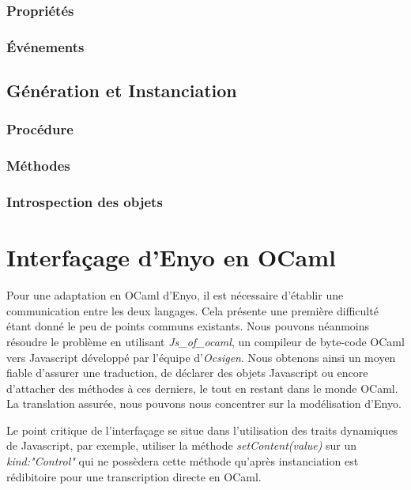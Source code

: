 \documentclass[11pt,a4paper]{report}
\begin{document}
\subsection{Propriétés}
\subsection{\'Evénements}

\section{Génération et Instanciation}
\subsection{Procédure}
\subsection{Méthodes}
\subsection{Introspection des objets}


\chapter{Interfaçage d'Enyo en OCaml}

Pour une adaptation en OCaml d'Enyo, il est nécessaire d'établir une communication
entre les deux langages. Cela présente une première difficulté étant donné le peu
de points communs existants. Nous pouvons néanmoins résoudre le problème en
utilisant  \emph{Js\_of\_ocaml}, un compileur de byte-code OCaml vers Javascript développé par 
l'équipe d'\emph{Ocsigen}. Nous obtenons ainsi un moyen fiable d'assurer une traduction, 
de déclarer des objets Javascript ou encore d'attacher des méthodes à ces derniers, le tout
en restant dans le monde OCaml. La translation assurée, nous pouvons nous concentrer sur 
la modélisation d'Enyo.

Le point critique de l'interfaçage se situe dans l'utilisation des traits 
dynamiques de Javascript, par exemple, utiliser la méthode \emph{setContent(value)} sur un
\emph{kind:"Control"} qui ne possèdera cette méthode qu'après instanciation est
rédibitoire pour une transcription directe en OCaml.\medskip
\end{document}
